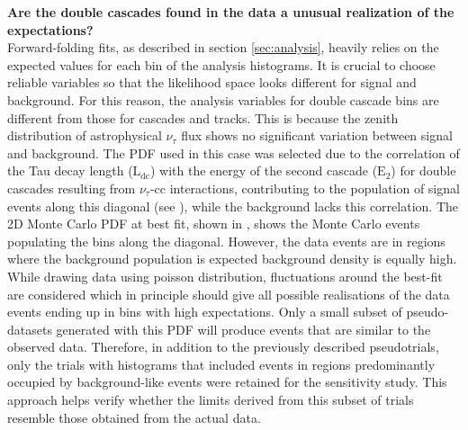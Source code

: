 \textbf{Are the double cascades found in the data a unusual realization of the expectations?}\\

Forward-folding fits, as described in section \ref{sec:analysis}, heavily relies on the expected values for each bin of the analysis histograms. It is crucial to choose reliable variables so that the likelihood space looks different for signal and background. For this reason, the analysis variables for double cascade bins are different from those for cascades and tracks. This is because the zenith distribution of astrophysical $\nu_{\tau}$ flux shows no significant variation between signal and background. The PDF used in this case was selected due to the correlation of the Tau decay length ($\mathrm{L}_{\mathrm{dc}}$) with the energy of the second cascade ($\mathrm{E}_{2}$) for double cascades resulting from $\nu_{\tau}$-cc interactions, contributing to the population of signal events along this diagonal (see ), while the background lacks this correlation. The 2D Monte Carlo PDF at best fit, shown in , shows the  Monte Carlo events populating the bins along the diagonal. However, the data events are in regions where the background population is expected background density is equally high. While drawing data using poisson distribution, fluctuations around the best-fit are considered which in principle should give all possible realisations of the data events ending up in bins with high expectations. Only a small subset of pseudo-datasets generated with this PDF will produce events that are similar to the observed data. Therefore, in addition to the previously described pseudotrials, only the trials with histograms that included events in regions predominantly occupied by background-like events were retained for the sensitivity study. This approach helps verify whether the limits derived from this subset of trials resemble those obtained from the actual data.

